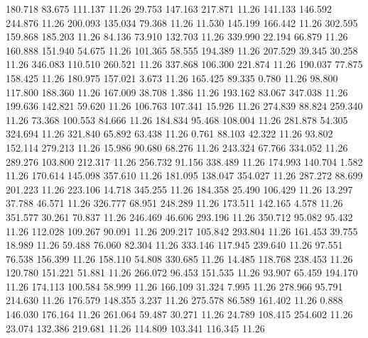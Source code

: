  180.718   83.675  111.137        11.26
  29.753  147.163  217.871        11.26
 141.133  146.592  244.876        11.26
 200.093  135.034   79.368        11.26
  11.530  145.199  166.442        11.26
 302.595  159.868  185.203        11.26
  84.136   73.910  132.703        11.26
 339.990   22.194   66.879        11.26
 160.888  151.940   54.675        11.26
 101.365   58.555  194.389        11.26
 207.529   39.345   30.258        11.26
 346.083  110.510  260.521        11.26
 337.868  106.300  221.874        11.26
 190.037   77.875  158.425        11.26
 180.975  157.021    3.673        11.26
 165.425   89.335    0.780        11.26
  98.800  117.800  188.360        11.26
 167.009   38.708    1.386        11.26
 193.162   83.067  347.038        11.26
 199.636  142.821   59.620        11.26
 106.763  107.341   15.926        11.26
 274.839   88.824  259.340        11.26
  73.368  100.553   84.666        11.26
 184.834   95.468  108.004        11.26
 281.878   54.305  324.694        11.26
 321.840   65.892   63.438        11.26
   0.761   88.103   42.322        11.26
  93.802  152.114  279.213        11.26
  15.986   90.680   68.276        11.26
 243.324   67.766  334.052        11.26
 289.276  103.800  212.317        11.26
 256.732   91.156  338.489        11.26
 174.993  140.704    1.582        11.26
 170.614  145.098  357.610        11.26
 181.095  138.047  354.027        11.26
 287.272   88.699  201.223        11.26
 223.106   14.718  345.255        11.26
 184.358   25.490  106.429        11.26
  13.297   37.788   46.571        11.26
 326.777   68.951  248.289        11.26
 173.511  142.165    4.578        11.26
 351.577   30.261   70.837        11.26
 246.469   46.606  293.196        11.26
 350.712   95.082   95.432        11.26
 112.028  109.267   90.091        11.26
 209.217  105.842  293.804        11.26
 161.453   39.755   18.989        11.26
  59.488   76.060   82.304        11.26
 333.146  117.945  239.640        11.26
  97.551   76.538  156.399        11.26
 158.110   54.808  330.685        11.26
  14.485  118.768  238.453        11.26
 120.780  151.221   51.881        11.26
 266.072   96.453  151.535        11.26
  93.907   65.459  194.170        11.26
 174.113  100.584   58.999        11.26
 166.109   31.324    7.995        11.26
 278.966   95.791  214.630        11.26
 176.579  148.355    3.237        11.26
 275.578   86.589  161.402        11.26
   0.888  146.030  176.164        11.26
 261.064   59.487   30.271        11.26
  24.789  108.415  254.602        11.26
  23.074  132.386  219.681        11.26
 114.809  103.341  116.345        11.26
